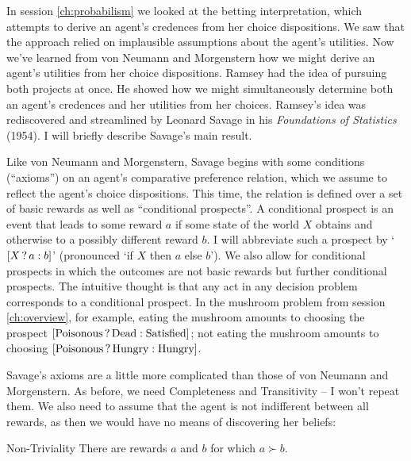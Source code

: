 In session \ref{ch:probabilism} we looked at the betting
interpretation, which attempts to derive an agent's credences from her
choice dispositions. We saw that the approach relied on implausible
assumptions about the agent's utilities. Now we've learned from von
Neumann and Morgenstern how we might derive an agent's utilities from
her choice dispositions. Ramsey had the idea of pursuing both projects
at once. He showed how we might simultaneously determine both an
agent's credences and her utilities from her choices.%
%
%
Ramsey's idea was rediscovered and streamlined by Leonard Savage in
his \emph{Foundations of Statistics} (1954). I will briefly describe
Savage's main result.

Like von Neumann and Morgenstern, Savage begins with some conditions
(``axioms'') on an agent's comparative preference relation, which we
assume to reflect the agent's choice dispositions. This time, the
relation is defined over a set of basic rewards as well as
``conditional prospects''. A conditional prospect is an event that
leads to some reward $a$ if some state of the world $X$ obtains and
otherwise to a possibly different reward $b$. I will abbreviate such a
prospect by `$[X\,?\, a :b]$' (pronounced `if $X$ then $a$ else $b$').
We also allow for conditional prospects in which the outcomes are not
basic rewards but further conditional prospects. The intuitive thought
is that any act in any decision problem corresponds to a conditional
prospect. In the mushroom problem from session \ref{ch:overview}, for
example, eating the mushroom amounts to choosing the prospect
$[\text{Poisonous}\,?\, \text{Dead} :\text{Satisfied}]$; not eating
the mushroom amounts to choosing
$[\text{Poisonous}\,?\, \text{Hungry} :\text{Hungry}]$.

Savage's axioms are a little more complicated than those of von
Neumann and Morgenstern. As before, we need Completeness and
Transitivity -- I won't repeat them. We also need to assume that the
agent is not indifferent between all rewards, as then we would have no
means of discovering her beliefs:
%
\begin{genericthm}{Non-Triviality}
  There are rewards $a$ and $b$ for which $a\succ b$.
\end{genericthm}

